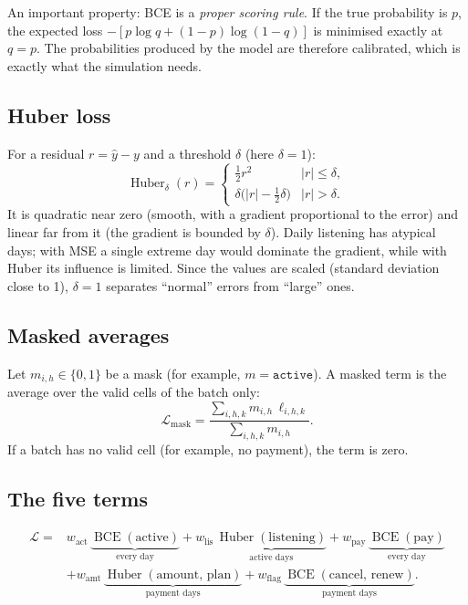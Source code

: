 \documentclass[11pt]{article}
\newcommand{\BCE}{\operatorname{BCE}}
\newcommand{\Huber}{\operatorname{Huber}}
\newcommand{\code}[1]{\texttt{#1}}
\begin{document}
An important property: BCE is a \emph{proper scoring rule}. If the true probability is $p$, the expected loss $-[p\log q + (1-p)\log(1-q)]$ is minimised exactly at $q = p$. The probabilities produced by the model are therefore calibrated, which is exactly what the simulation needs.

\subsection{Huber loss}

For a residual $r = \hat y - y$ and a threshold $\delta$ (here $\delta = 1$):
\begin{equation}
\Huber_\delta(r) =
\begin{cases}
\tfrac12 r^2 & |r| \le \delta, \\[0.3em]
\delta\big(|r| - \tfrac12 \delta\big) & |r| > \delta.
\end{cases}
\end{equation}
It is quadratic near zero (smooth, with a gradient proportional to the error) and linear far from it (the gradient is bounded by $\delta$). Daily listening has atypical days; with MSE a single extreme day would dominate the gradient, while with Huber its influence is limited. Since the values are scaled (standard deviation close to 1), $\delta = 1$ separates ``normal'' errors from ``large'' ones.

\subsection{Masked averages}

Let $m_{i,h} \in \{0, 1\}$ be a mask (for example, $m = \code{active}$). A masked term is the average over the valid cells of the batch only:
\begin{equation}
\mathcal L_{\text{mask}} = \frac{\sum_{i,h,k} m_{i,h}\, \ell_{i,h,k}}{\sum_{i,h,k} m_{i,h}} .
\end{equation}
If a batch has no valid cell (for example, no payment), the term is zero.

\subsection{The five terms}

\begin{equation}
\begin{aligned}
\mathcal L ={}&
w_{\text{act}}\, \underbrace{\BCE(\text{active})}_{\text{every day}}
+ w_{\text{lis}}\, \underbrace{\Huber(\text{listening})}_{\text{active days}}
+ w_{\text{pay}}\, \underbrace{\BCE(\text{pay})}_{\text{every day}} \\
&+ w_{\text{amt}}\, \underbrace{\Huber(\text{amount, plan})}_{\text{payment days}}
+ w_{\text{flag}}\, \underbrace{\BCE(\text{cancel, renew})}_{\text{payment days}} .
\end{aligned}
\end{equation}
\end{document}
